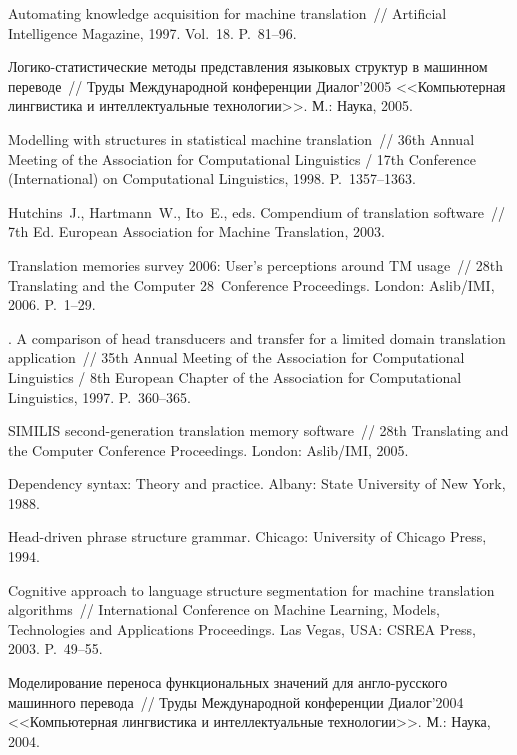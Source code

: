 \begin{multicols}{2}
{{\begin{thebibliography}{99}
Automating knowledge acquisition for machine translation~// Artificial
Intelligence Magazine, 1997. Vol.~18. P.~81--96.

Логико-статистические методы представления языковых
структур в машинном переводе~// Труды Международной конференции
Диалог'2005 <<Компьютерная лингвистика и интеллектуальные технологии>>.
М.: Наука, 2005.

 Modelling with structures in statistical machine 
translation~// 36th Annual Meeting of the Association for Computational 
Linguistics / 17th Conference (International) on Computational Linguistics, 
1998. P.~1357--1363.

Hutchins~J., Hartmann~W., Ito~E., eds.
Compendium of translation software~// 7th Ed.
European Association for Machine Translation, 2003.

Translation memories survey 2006: User's perceptions
around TM usage~//  28th Translating and the Computer
28~Conference Proceedings. London: Aslib/IMI, 2006. P.~1--29.

. A comparison of head transducers 
and transfer for a limited domain translation application~// 35th Annual 
Meeting of the Association for Computational Linguistics / 8th European Chapter 
of the Association for Computational Linguistics, 1997. P.~360--365.

SIMILIS second-generation translation memory software~//
28th Translating and the Computer Conference Proceedings.
London: Aslib/IMI, 2005.

Dependency syntax: Theory and practice.
Albany: State University of New York, 1988.

Head-driven phrase structure grammar. Chicago: University of Chicago Press, 1994.

Cognitive approach to language structure segmentation
for machine translation algorithms~//
International Conference
on Machine Learning, Models, Technologies and Applications Proceedings.
Las Vegas, USA: CSREA Press, 2003. P.~49--55.

Моделирование переноса функциональных значений для
англо-русского машинного перевода~// Труды Международной конференции
Диалог'2004 <<Компьютерная лингвистика и интеллектуальные технологии>>.
М.: Наука, 2004.


\end{thebibliography}}}
\end{multicols}
